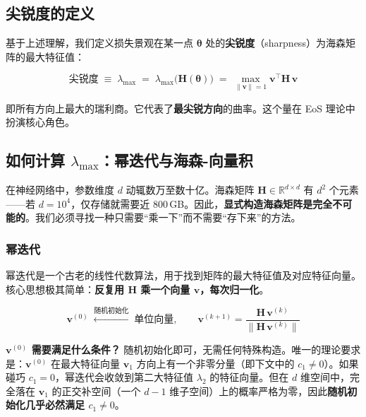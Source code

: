 \documentclass[11pt,a4paper]{ctexart}
\newcommand{\lmax}{\lambda_{\max}}
\newcommand{\Hmat}{\mathbf{H}}
\begin{document}
\subsection{尖锐度的定义}

基于上述理解，我们定义损失景观在某一点 $\boldsymbol{\theta}$ 处的\textbf{尖锐度}（sharpness）为海森矩阵的最大特征值：

\begin{equation}\label{eq:sharpness}
  \boxed{\text{尖锐度} \;\equiv\; \lmax \;=\; \lambda_{\max}\bigl(\Hmat(\boldsymbol{\theta})\bigr) \;=\; \max_{\|\mathbf{v}\|=1} \mathbf{v}^\top \Hmat\, \mathbf{v}}
\end{equation}

即所有方向上最大的瑞利商。它代表了\textbf{最尖锐方向}的曲率。这个量在 EoS 理论中扮演核心角色。

\subsection{如何计算 $\lmax$：幂迭代与海森-向量积}\label{sec:power-iter}

在神经网络中，参数维度 $d$ 动辄数万至数十亿。海森矩阵 $\Hmat \in \mathbb{R}^{d\times d}$ 有 $d^2$ 个元素——若 $d=10^4$，仅存储就需要近 800\,GB。因此，\textbf{显式构造海森矩阵是完全不可能的}。我们必须寻找一种只需要``乘一下''而不需要``存下来''的方法。

\subsubsection*{幂迭代}

幂迭代是一个古老的线性代数算法，用于找到矩阵的最大特征值及对应特征向量。核心思想极其简单：\textbf{反复用 $\Hmat$ 乘一个向量 $\mathbf{v}$，每次归一化}。

\begin{equation}\label{eq:power-iter}
  \mathbf{v}^{(0)} \;\xleftarrow{\text{随机初始化}}\; \text{单位向量}, \qquad
  \mathbf{v}^{(k+1)} = \frac{\Hmat\,\mathbf{v}^{(k)}}{\|\Hmat\,\mathbf{v}^{(k)}\|}
\end{equation}

\textbf{$\mathbf{v}^{(0)}$ 需要满足什么条件？} 随机初始化即可，无需任何特殊构造。唯一的理论要求是：$\mathbf{v}^{(0)}$ 在最大特征向量 $\mathbf{v}_1$ 方向上有一个非零分量（即下文中的 $c_1 \neq 0$）。如果碰巧 $c_1=0$，幂迭代会收敛到第二大特征值 $\lambda_2$ 的特征向量。但在 $d$ 维空间中，完全落在 $\mathbf{v}_1$ 的正交补空间（一个 $d-1$ 维子空间）上的概率严格为零，因此\textbf{随机初始化几乎必然满足 $c_1 \neq 0$}。
\end{document}
